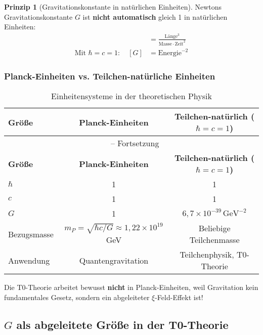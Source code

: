 \documentclass[12pt,a4paper]{article}
\theoremstyle{definition}
\newtheorem{principle}{Prinzip}
\begin{document}
\begin{principle}[Gravitationskonstante in natürlichen Einheiten]
	Newtons Gravitationskonstante $G$ ist \textbf{nicht automatisch} gleich 1 in natürlichen Einheiten:
	\begin{align}
		[G] &= \frac{\text{Länge}^3}{\text{Masse} \cdot \text{Zeit}^2} \\
		\text{Mit } \hbar = c = 1: \quad [G] &= \text{Energie}^{-2}
	\end{align}
\end{principle}

\subsubsection{Planck-Einheiten vs. Teilchen-natürliche Einheiten}

\begin{longtable}{lcc}
	\caption{Einheitensysteme in der theoretischen Physik} \\
	\toprule
	\textbf{Größe} & \textbf{Planck-Einheiten} & \textbf{Teilchen-natürlich ($\hbar = c = 1$)} \\
	\midrule
	\endfirsthead
	\multicolumn{3}{c}{\tablename\ \thetable{} -- Fortsetzung} \\
	\toprule
	\textbf{Größe} & \textbf{Planck-Einheiten} & \textbf{Teilchen-natürlich ($\hbar = c = 1$)} \\
	\midrule
	\endhead
	$\hbar$ & 1 & 1 \\
	$c$ & 1 & 1 \\
	$G$ & 1 & $6{,}7 \times 10^{-39} \, \text{GeV}^{-2}$ \\
	Bezugsmasse & $m_P = \sqrt{\hbar c / G} \approx 1{,}22 \times 10^{19}$ GeV & Beliebige Teilchenmasse \\
	Anwendung & Quantengravitation & Teilchenphysik, T0-Theorie \\
	\bottomrule
\end{longtable}

\begin{revolutionary}
	Die T0-Theorie arbeitet bewusst \textbf{nicht} in Planck-Einheiten, weil Gravitation kein fundamentales Gesetz, sondern ein abgeleiteter $\xi$-Feld-Effekt ist!
\end{revolutionary}

\subsection{$G$ als abgeleitete Größe in der T0-Theorie}
\end{document}
